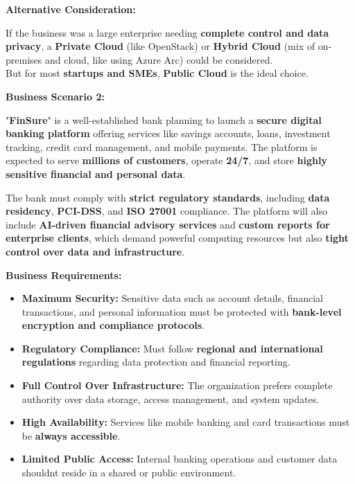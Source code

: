 \documentclass[12pt]{article}
\begin{document}
\textbf{Alternative Consideration:}

If the business was a large enterprise needing \textbf{complete control
and data privacy}, a \textbf{Private Cloud} (like OpenStack) or
\textbf{Hybrid Cloud} (mix of on-premises and cloud, like using Azure
Arc) could be considered.\\
But for most \textbf{startups and SMEs}, \textbf{Public Cloud} is the
ideal choice.

\textbf{Business Scenario 2:}

"\textbf{FinSure}" is a well-established bank planning to launch a
\textbf{secure digital banking platform} offering services like savings
accounts, loans, investment tracking, credit card management, and mobile
payments. The platform is expected to serve \textbf{millions of
customers}, operate \textbf{24/7}, and store \textbf{highly sensitive
financial and personal data}.

The bank must comply with \textbf{strict regulatory standards},
including \textbf{data residency}, \textbf{PCI-DSS}, and \textbf{ISO
27001} compliance. The platform will also include \textbf{AI-driven
financial advisory services} and \textbf{custom reports for enterprise
clients}, which demand powerful computing resources but also
\textbf{tight control over data and infrastructure}.

\textbf{Business Requirements:}

\begin{itemize}
\item
  \textbf{Maximum Security:} Sensitive data such as account details,
  financial transactions, and personal information must be protected
  with \textbf{bank-level encryption and compliance protocols}.
\item
  \textbf{Regulatory Compliance:} Must follow \textbf{regional and
  international regulations} regarding data protection and financial
  reporting.
\item
  \textbf{Full Control Over Infrastructure:} The organization prefers
  complete authority over data storage, access management, and system
  updates.
\item
  \textbf{High Availability:} Services like mobile banking and card
  transactions must be \textbf{always accessible}.
\item
  \textbf{Limited Public Access:} Internal banking operations and
  customer data shouldn\textquotesingle t reside in a shared or public
  environment.
\end{itemize}
\end{document}
